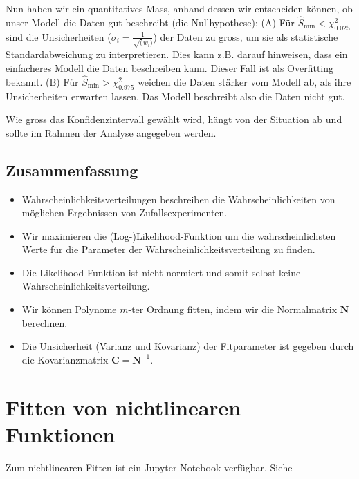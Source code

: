 Nun haben wir ein quantitatives Mass, anhand dessen wir entscheiden können, ob unser Modell die Daten gut beschreibt (die Nullhypothese): (A) Für $\hat{S}_\text{min} < \chi^2_{0.025}$ sind die Unsicherheiten ($\sigma_i = \frac{1}{\sqrt(w_i)}$) der Daten zu gross, um sie als statistische Standardabweichung zu interpretieren. Dies kann z.B. darauf hinweisen, dass ein einfacheres Modell die Daten beschreiben kann. Dieser Fall ist als Overfitting bekannt. (B) Für $\hat{S}_\text{min} > \chi^2_{0.975}$ weichen die Daten stärker vom Modell ab, als ihre Unsicherheiten erwarten lassen. Das Modell beschreibt also die Daten nicht gut.

Wie gross das Konfidenzintervall gewählt wird, hängt von der Situation ab und sollte im Rahmen der Analyse angegeben werden.


\subsection{Zusammenfassung}
\label{subsec:vl8-6}

\begin{itemize}
    \setlength\itemsep{0em}
        \item Wahrscheinlichkeitsverteilungen beschreiben die Wahrscheinlichkeiten von m\"oglichen Ergebnissen von Zufallsexperimenten.
        \item Wir maximieren die (Log-)Likelihood-Funktion um die wahrscheinlichsten Werte f\"ur die Parameter der Wahrscheinlichkeitsverteilung zu finden.
        \item Die Likelihood-Funktion ist nicht normiert und somit selbst keine Wahrscheinlichkeitsverteilung.
        \item Wir k\"onnen Polynome $m$-ter Ordnung fitten, indem wir die Normalmatrix $\boldsymbol{N}$ berechnen.
        \item Die Unsicherheit (Varianz und Kovarianz) der Fitparameter ist gegeben durch die Kovarianzmatrix $\boldsymbol{C} = \boldsymbol{N}^{-1}$.
\end{itemize}

\section{Fitten von nichtlinearen Funktionen}\label{sec:nonLinearFit}
\begin{center}
\begin{tcolorbox}[enhanced,width=6in,center upper,
    fontupper=\large,drop fuzzy shadow southwest,
    colframe=blue!50!black,colback=blue!10]
    {Zum nichtlinearen Fitten ist ein Jupyter-Notebook verfügbar. Siehe  }
\end{tcolorbox}
\end{center}

